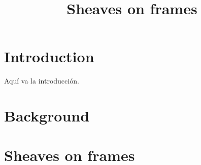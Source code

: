 \documentclass[11pt]{amsart}
\theoremstyle{plain}
\theoremstyle{definition}
\begin{document}

\title{Sheaves on frames}


\author{}
\email{}
\address{}


\address{}

\begin{abstract}

\end{abstract}

\maketitle
\section{Introduction}
Aquí va la introducción.

\section{Background}

\section{Sheaves on frames}




\end{document}
